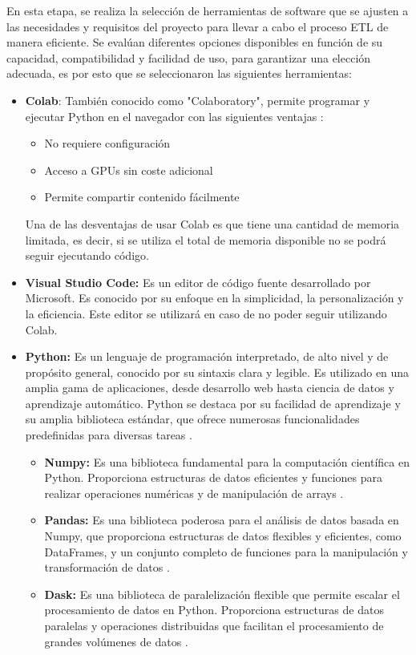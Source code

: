 En esta etapa, se realiza la selección de herramientas de software que se ajusten a las necesidades y requisitos del proyecto para llevar a cabo el proceso ETL de manera eficiente. Se evalúan diferentes opciones disponibles en función de su capacidad, compatibilidad y facilidad de uso, para garantizar una elección adecuada, es por esto que se seleccionaron las siguientes herramientas:
\begin{itemize}
    \item \textbf{Colab}: También conocido como "Colaboratory", permite programar y ejecutar Python en el navegador con las siguientes ventajas \cite{colab}:
    \begin{itemize}
        \item No requiere configuración
        \item Acceso a GPUs sin coste adicional
        \item Permite compartir contenido fácilmente
    \end{itemize}
    Una de las desventajas de usar Colab es que tiene una cantidad de memoria limitada, es decir, si se utiliza el total de memoria disponible no se podrá seguir ejecutando código.
    \item \textbf{Visual Studio Code:} Es un editor de código fuente desarrollado por Microsoft. Es conocido por su enfoque en la simplicidad, la personalización y la eficiencia. Este editor se utilizará en caso de no poder seguir utilizando Colab.
    \item \textbf{Python:} Es un lenguaje de programación interpretado, de alto nivel y de propósito general, conocido por su sintaxis clara y legible. Es utilizado en una amplia gama de aplicaciones, desde desarrollo web hasta ciencia de datos y aprendizaje automático. Python se destaca por su facilidad de aprendizaje y su amplia biblioteca estándar, que ofrece numerosas funcionalidades predefinidas para diversas tareas \cite{python}.
    \begin{itemize}
        \item \textbf{Numpy:} Es una biblioteca fundamental para la computación científica en Python. Proporciona estructuras de datos eficientes y funciones para realizar operaciones numéricas y de manipulación de arrays \cite{numpy}.
        \item \textbf{Pandas:} Es una biblioteca poderosa para el análisis de datos basada en Numpy, que proporciona estructuras de datos flexibles y eficientes, como DataFrames, y un conjunto completo de funciones para la manipulación y transformación de datos \cite{pandas}.
        \item \textbf{Dask:} Es una biblioteca de paralelización flexible que permite escalar el procesamiento de datos en Python. Proporciona estructuras de datos paralelas y operaciones distribuidas que facilitan el procesamiento de grandes volúmenes de datos \cite{dask}.
    \end{itemize}
\end{itemize}
